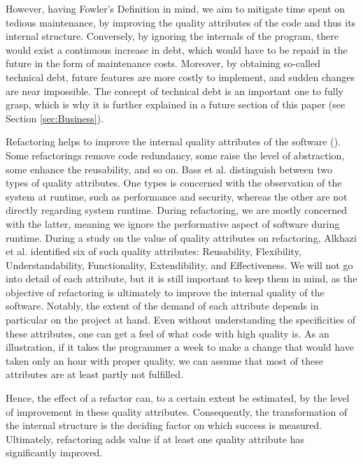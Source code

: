 However, having Fowler's Definition in mind, 
	we aim to mitigate time spent on tedious maintenance, 
	by improving the quality attributes of the code and thus its internal structure.
Conversely, by ignoring the internals of the program, 
	there would exist a continuous increase in debt, 
	which would have to be repaid in the future in the form of maintenance costs.
Moreover, by obtaining so-called technical debt, 
	future features are more costly to implement, and sudden changes are near impossible. 
The concept of technical debt is an important one to fully grasp, 
	which is why it is further explained in a future section of this paper 
(see Section \ref{sec:Business}).
	

Refactoring helps to improve the internal quality attributes of the software (\cite[p.~129]{mens2004}). 
Some refactorings remove code redundancy, 
	some raise the level of abstraction, 
	some enhance the reusability, and so on.
Bass et al. \textcite{bass1998} distinguish 
	between two types of quality attributes. 
One types is concerned with the observation of the system at runtime, 
	such as performance and security, 
	whereas the other are not directly regarding system runtime.
During refactoring, we are mostly concerned with the latter, 
	meaning we ignore the performative aspect of software during runtime.
During a study on the value of quality attributes on refactoring, 
	Alkhazi et al. \textcite[p.~4]{alkhazi2020} identified 
	six of such quality attributes: 
	Reusability, Flexibility, Understandability, 
	Functionality, Extendibility, and Effectiveness.
We will not go into detail of each attribute, 
	but it is still important to keep them in mind,
	as the objective of refactoring is  
	ultimately to improve the internal quality of the software.
Notably, the extent of the demand of each attribute 
	depends in particular on the project at hand.
Even without understanding the specificities of these attributes,
	one can get a feel of what code with high quality is.
As an illustration, 
	if it takes the programmer a week to make a change 
	that would have taken only an hour with proper quality, 
	we can assume that most of these attributes are at 
	least partly not fulfilled.

Hence, the effect of a refactor can, to a certain extent be estimated, 
	by the level of improvement in these quality attributes.
Consequently, the transformation of the internal structure 
	is the deciding factor on which success is measured.
Ultimately, refactoring adds value if at least one quality attribute has significantly improved.

